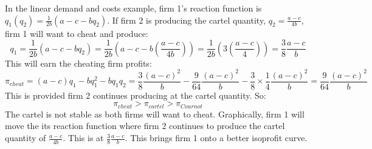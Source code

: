 \documentclass{article}
\begin{document}
In the linear demand and costs example, firm 1's reaction
function is $q_1\left( q_2 \right)=\frac{1}{2b}\left( a-c-bq_2 \right)$. If firm 2 is producing the cartel quantity, $q_2=\frac{a-c}{4b}$, firm 1 will
want to cheat and produce:
\[
  q_1=\frac{1}{2b}\left( a-c-bq_2 \right)=\frac{1}{2b}\left( a-c-b\left( \frac{a-c}{4b} \right) \right)=\frac{1}{2b}\left( 3\left( \frac{a-c}{4} \right) \right)=\frac{3}{8}\frac{a-c}{b}
\]
This will earn the cheating firm profits:
\[\pi_{cheat}=\left( a-c \right)q_1-bq_1^2-bq_1q_2=
  \frac{3}{8}\frac{\left( a-c \right)^2}{b}- \frac{9}{64} \frac{\left( a-c \right)^2}{b}-\frac{3}{8}\times \frac{1}{4}\frac{\left( a-c \right)^2}{b}=
  \frac{9}{64}\frac{\left( a-c \right)^2}{b}
\]
This is provided firm 2 continues producing at the cartel quantity. So:
\[
  \pi_{cheat}>\pi_{cartel}>\pi_{Cournot}
\]
The cartel is not stable as both firms will want to cheat. Graphically, firm 1 will move the its reaction function where firm 2 continues to produce the cartel quantity of $\frac{a-c}{4b}$. This is at $\frac{3}{8}\frac{a-c}{b}$. This brings firm 1 onto a better isoprofit curve.
\begin{center}
\end{center}
\end{document}
